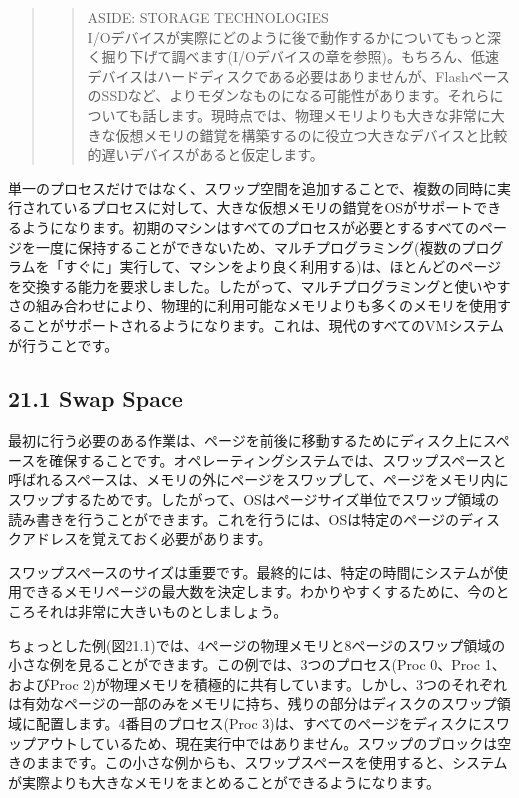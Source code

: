 \begin{quote}
\begin{quote}
ASIDE: STORAGE TECHNOLOGIES\\
I/Oデバイスが実際にどのように後で動作するかについてもっと深く掘り下げて調べます(I/Oデバイスの章を参照)。もちろん、低速デバイスはハードディスクである必要はありませんが、FlashベースのSSDなど、よりモダンなものになる可能性があります。それらについても話します。現時点では、物理メモリよりも大きな非常に大きな仮想メモリの錯覚を構築するのに役立つ大きなデバイスと比較的遅いデバイスがあると仮定します。
\end{quote}
\end{quote}

単一のプロセスだけではなく、スワップ空間を追加することで、複数の同時に実行されているプロセスに対して、大きな仮想メモリの錯覚をOSがサポートできるようになります。初期のマシンはすべてのプロセスが必要とするすべてのページを一度に保持することができないため、マルチプログラミング(複数のプログラムを「すぐに」実行して、マシンをより良く利用する)は、ほとんどのページを交換する能力を要求しました。したがって、マルチプログラミングと使いやすさの組み合わせにより、物理的に利用可能なメモリよりも多くのメモリを使用することがサポートされるようになります。これは、現代のすべてのVMシステムが行うことです。

\hypertarget{swap-space}{%
\subsection*{21.1 Swap Space}\label{swap-space}}

最初に行う必要のある作業は、ページを前後に移動するためにディスク上にスペースを確保することです。オペレーティングシステムでは、スワップスペースと呼ばれるスペースは、メモリの外にページをスワップして、ページをメモリ内にスワップするためです。したがって、OSはページサイズ単位でスワップ領域の読み書きを行うことができます。これを行うには、OSは特定のページのディスクアドレスを覚えておく必要があります。

スワップスペースのサイズは重要です。最終的には、特定の時間にシステムが使用できるメモリページの最大数を決定します。わかりやすくするために、今のところそれは非常に大きいものとしましょう。

ちょっとした例(図21.1)では、4ページの物理メモリと8ページのスワップ領域の小さな例を見ることができます。この例では、3つのプロセス(Proc
0、Proc 1、およびProc
2)が物理メモリを積極的に共有しています。しかし、3つのそれぞれは有効なページの一部のみをメモリに持ち、残りの部分はディスクのスワップ領域に配置します。4番目のプロセス(Proc
3)は、すべてのページをディスクにスワップアウトしているため、現在実行中ではありません。スワップのブロックは空きのままです。この小さな例からも、スワップスペースを使用すると、システムが実際よりも大きなメモリをまとめることができるようになります。

